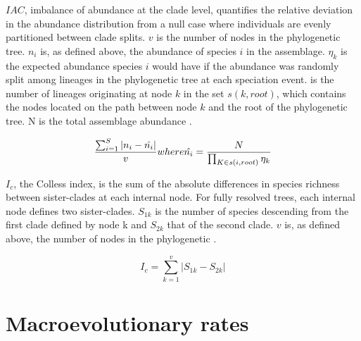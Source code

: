 \documentclass[]{book}
\newenvironment{Shaded}{\begin{snugshade}}{\end{snugshade}}
\newcommand{\KeywordTok}[1]{\textcolor[rgb]{0.13,0.29,0.53}{\textbf{{#1}}}}
\newcommand{\DecValTok}[1]{\textcolor[rgb]{0.00,0.00,0.81}{{#1}}}
\newcommand{\StringTok}[1]{\textcolor[rgb]{0.31,0.60,0.02}{{#1}}}
\newcommand{\CommentTok}[1]{\textcolor[rgb]{0.56,0.35,0.01}{\textit{{#1}}}}
\newcommand{\ControlFlowTok}[1]{\textcolor[rgb]{0.13,0.29,0.53}{\textbf{{#1}}}}
\newcommand{\OperatorTok}[1]{\textcolor[rgb]{0.81,0.36,0.00}{\textbf{{#1}}}}
\newcommand{\NormalTok}[1]{{#1}}
\theoremstyle{definition}
\theoremstyle{definition}
\theoremstyle{remark}
\begin{document}
\(IAC\), imbalance of abundance at the clade level, quantifies the
relative deviation in the abundance distribution from a null case where
individuals are evenly partitioned between clade splits. \(v\) is the
number of nodes in the phylogenetic tree. \(n_{i}\) is, as defined
above, the abundance of species \(i\) in the assemblage. \(\eta_{k}\) is
the expected abundance species \(i\) would have if the abundance was
randomly split among lineages in the phylogenetic tree at each
speciation event. is the number of lineages originating at node \(k\) in
the set \(s(k,root)\), which contains the nodes located on the path
between node \(k\) and the root of the phylogenetic tree. N is the total
assemblage abundance \citep{Cadotte2010}.

\[
\dfrac{\sum_{i=1}^{S}  |n_{i} - \hat{n_{i}}|}
{v} \\
\ \\
where \\ 
\ \\
\hat{n_{i}} = \dfrac{N}{\prod_{K \in s(i, root)}\eta_{k}}
\]

\(I_{c}\), the Colless index, is the sum of the absolute differences in
species richness between sister-clades at each internal node. For fully
resolved trees, each internal node defines two sister-clades. \(S_{1k}\)
is the number of species descending from the first clade defined by node
k and \(S_{2k}\) that of the second clade. \(v\) is, as defined above,
the number of nodes in the phylogenetic \citep{Colless1982}.

\[
I_{c} = \sum_{k=1}^{v} |S_{1k} - S_{2k}|
\]

\hypertarget{macroevolutionary-rates}{\section{Macroevolutionary
rates}\label{macroevolutionary-rates}}

\begin{Shaded}
\end{Shaded}
\end{document}

